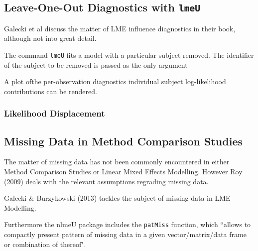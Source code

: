 \documentclass[a4paper,12pt]{article}
\begin{document}
\subsection*{Leave-One-Out Diagnostics with \texttt{lmeU}}
Galecki et al discuss the matter of LME influence diagnostics in their book, although not into great detail.


The command \texttt{lmeU} fits a model with a particular subject removed. The identifier of the subject to be removed is passed as the only argument

A plot ofthe per-observation diagnostics individual subject log-likelihood contributions can be rendered.

\subsubsection*{Likelihood Displacement}




\newpage



\newpage
\subsection*{Missing Data in Method Comparison Studies}

The matter of missing data has not been commonly encountered in either Method Comparison Studies or Linear Mixed Effects Modelling. However Roy (2009) deals with the relevant assumptions regrading missing data.

Galecki \& Burzykowski (2013) tackles the subject of missing data in LME Modelling.

Furthermore the nlmeU package includes the \texttt{patMiss} function, which ``allows to compactly present pattern of missing data in a given vector/matrix/data
frame or combination of thereof".

\newpage

\end{document}
